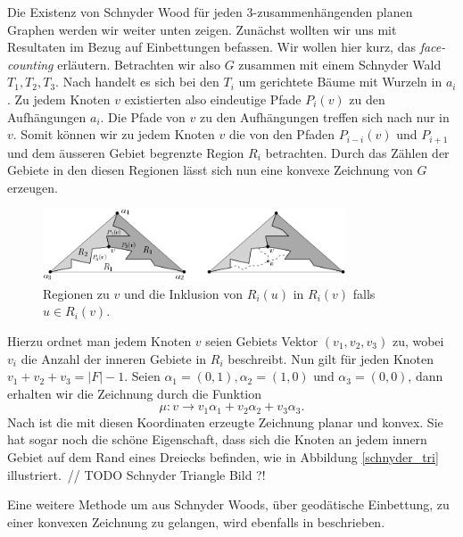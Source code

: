 Die Existenz von Schnyder Wood für jeden 3-zusammenhängenden planen Graphen werden wir weiter unten zeigen. Zunächst wollten wir uns mit Resultaten im Bezug auf Einbettungen befassen.
Wir wollen hier kurz, das \textit{face-counting}\cite{felsner01} erläutern. Betrachten wir also $G$ zusammen mit einem Schnyder Wald $T_1,T_2,T_3$. Nach \cite[Korollar 2.5]{felsner04} handelt es sich bei den $T_i$ um gerichtete Bäume mit Wurzeln in $a_i$. Zu jedem Knoten $v$ existierten also eindeutige Pfade $P_i(v)$ zu den Aufhängungen $a_i$. Die Pfade von $v$ zu den Aufhängungen treffen sich nach \cite[Lemma 2.4]{felsner04} nur in $v$. Somit können wir zu jedem Knoten $v$ die von den Pfaden $P_{i-i}(v)$ und $P_{i+1}$ und dem äusseren Gebiet begrenzte Region $R_i$ betrachten. Durch das Zählen der Gebiete in den diesen Regionen lässt sich nun eine konvexe Zeichnung von $G$ erzeugen.

\begin{figure}[h]
	\centering
  \includegraphics[width=0.8\textwidth]{schnyder_reg.png}
	\caption{Regionen zu $v$ und die Inklusion von $R_i(u)$ in $R_i(v)$ falls $u \in R_i(v)$.}
\end{figure}

Hierzu ordnet man jedem Knoten $v$ seien Gebiets Vektor $(v_1,v_2,v_3)$ zu, wobei $v_i$ die Anzahl der inneren Gebiete in $R_i$ beschreibt. Nun gilt für jeden Knoten $v_1+v_2+v_3 = |F|-1$. Seien $\alpha_1 = (0,1),\alpha_2 = (1,0)$ und $\alpha_3 = (0,0)$, dann erhalten wir die Zeichnung durch die Funktion 
$$\mu:v\to v_1\alpha_1 + v_2\alpha_2+v_3\alpha_3.$$ 
Nach \cite[Theorem 2.7]{felsner04} ist die mit diesen Koordinaten erzeugte Zeichnung planar und konvex. Sie hat sogar noch die schöne Eigenschaft, dass sich die Knoten an jedem innern Gebiet auf dem Rand eines Dreiecks befinden, wie in Abbildung \ref{schnyder_tri} illustriert.\
// TODO Schnyder Triangle Bild ?!

Eine weitere Methode um aus Schnyder Woods, über geodätische Einbettung, zu einer konvexen Zeichnung zu gelangen, wird ebenfalls in \cite{felsner04} beschrieben.

